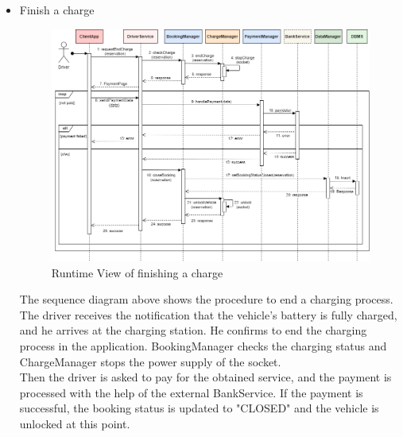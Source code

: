 \documentclass[../main.tex]{subfiles}
\begin{document}
\begin{itemize}
    \newpage
    \item Finish a charge
    {
    \vspace{2em}
    \begin{figure}[H]
    \centering
    \includegraphics[width=\textwidth]{runtimeview/rv_endCharge.png}
    \caption{Runtime View of finishing a charge}
    \label{fig:rv_end}
    \end{figure}}
    The sequence diagram above shows the procedure to end a charging process. The driver receives the notification that the vehicle's battery is fully charged, and he arrives at the charging station. He confirms to end the charging process in the application. BookingManager checks the charging status and ChargeManager stops the power supply of the socket.
    \\
    Then the driver is asked to pay for the obtained service, and the payment is processed with the help of the external BankService. If the payment is successful, the booking status is updated to "CLOSED" and the vehicle is unlocked at this point.


\end{itemize}
\end{document}

